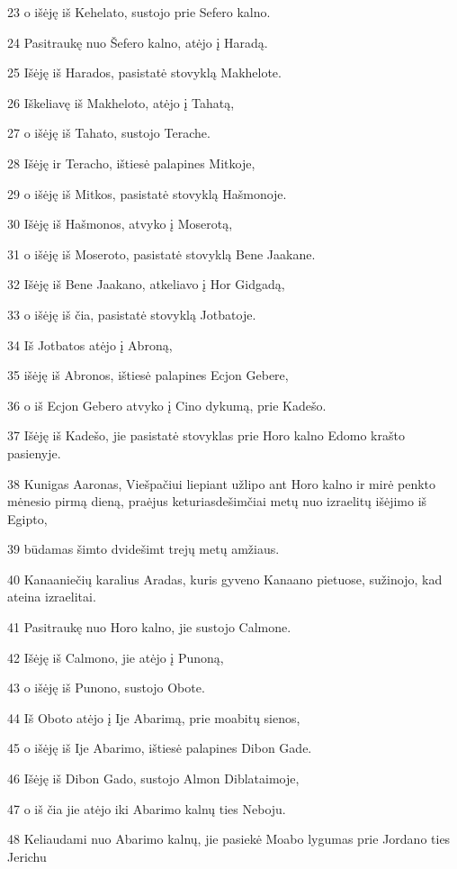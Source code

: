 \par 23 o išėję iš Kehelato, sustojo prie Sefero kalno. 
\par 24 Pasitraukę nuo Šefero kalno, atėjo į Haradą. 
\par 25 Išėję iš Harados, pasistatė stovyklą Makhelote. 
\par 26 Iškeliavę iš Makheloto, atėjo į Tahatą, 
\par 27 o išėję iš Tahato, sustojo Terache. 
\par 28 Išėję ir Teracho, ištiesė palapines Mitkoje, 
\par 29 o išėję iš Mitkos, pasistatė stovyklą Hašmonoje. 
\par 30 Išėję iš Hašmonos, atvyko į Moserotą, 
\par 31 o išėję iš Moseroto, pasistatė stovyklą Bene Jaakane. 
\par 32 Išėję iš Bene Jaakano, atkeliavo į Hor Gidgadą, 
\par 33 o išėję iš čia, pasistatė stovyklą Jotbatoje. 
\par 34 Iš Jotbatos atėjo į Abroną, 
\par 35 išėję iš Abronos, ištiesė palapines Ecjon Gebere, 
\par 36 o iš Ecjon Gebero atvyko į Cino dykumą, prie Kadešo. 
\par 37 Išėję iš Kadešo, jie pasistatė stovyklas prie Horo kalno Edomo krašto pasienyje. 
\par 38 Kunigas Aaronas, Viešpačiui liepiant užlipo ant Horo kalno ir mirė penkto mėnesio pirmą dieną, praėjus keturiasdešimčiai metų nuo izraelitų išėjimo iš Egipto, 
\par 39 būdamas šimto dvidešimt trejų metų amžiaus. 
\par 40 Kanaaniečių karalius Aradas, kuris gyveno Kanaano pietuose, sužinojo, kad ateina izraelitai. 
\par 41 Pasitraukę nuo Horo kalno, jie sustojo Calmone. 
\par 42 Išėję iš Calmono, jie atėjo į Punoną, 
\par 43 o išėję iš Punono, sustojo Obote. 
\par 44 Iš Oboto atėjo į Ije Abarimą, prie moabitų sienos, 
\par 45 o išėję iš Ije Abarimo, ištiesė palapines Dibon Gade. 
\par 46 Išėję iš Dibon Gado, sustojo Almon Diblataimoje, 
\par 47 o iš čia jie atėjo iki Abarimo kalnų ties Neboju. 
\par 48 Keliaudami nuo Abarimo kalnų, jie pasiekė Moabo lygumas prie Jordano ties Jerichu 
